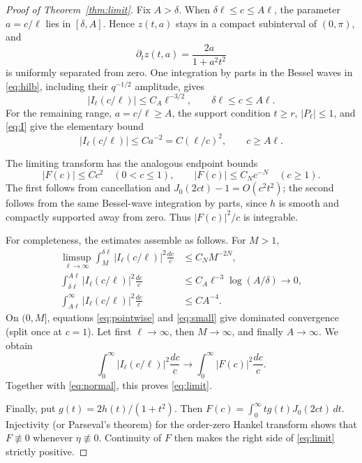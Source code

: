 \documentclass[11pt]{article}
\begin{document}
\begin{proof}[Proof of Theorem~\ref{thm:limit}]
Fix \(A>\delta\).  When \(\delta\ell\le c\le A\ell\), the parameter
\(a=c/\ell\) lies in \([\delta,A]\).  Hence \(z(t,a)\) stays in a compact
subinterval of \((0,\pi)\), and
\[
 \partial_t z(t,a)=\frac{2a}{1+a^2t^2}
\]
is uniformly separated from zero.  One integration by parts in the Bessel
waves in \eqref{eq:hilb}, including their \(q^{-1/2}\) amplitude, gives
\begin{equation}\label{eq:middle}
 |I_\ell(c/\ell)|\le C_A\ell^{-3/2},\qquad
 \delta\ell\le c\le A\ell.
\end{equation}
For the remaining range, \(a=c/\ell\ge A\), the support condition \(t\ge r\),
\(|P_\ell|\le1\), and \eqref{eq:I} give the elementary bound
\begin{equation}\label{eq:far}
 |I_\ell(c/\ell)|\le Ca^{-2}=C(\ell/c)^2,\qquad c\ge A\ell.
\end{equation}

The limiting transform has the analogous endpoint bounds
\begin{equation}\label{eq:Fbounds}
 |F(c)|\le Cc^2\quad(0<c\le1),\qquad
 |F(c)|\le C_Nc^{-N}\quad(c\ge1).
\end{equation}
The first follows from cancellation and \(J_0(2ct)-1=O(c^2t^2)\); the second
follows from the same Bessel-wave integration by parts, since \(h\) is smooth
and compactly supported away from zero.  Thus \(|F(c)|^2/c\) is integrable.

For completeness, the estimates assemble as follows.  For \(M>1\),
\begin{align*}
 \limsup_{\ell\to\infty}\int_M^{\delta\ell}
 |I_\ell(c/\ell)|^2\frac{dc}{c}&\le C_NM^{-2N},\\
 \int_{\delta\ell}^{A\ell}|I_\ell(c/\ell)|^2\frac{dc}{c}
 &\le C_A\ell^{-3}\log(A/\delta)\longrightarrow0,\\
 \int_{A\ell}^{\infty}|I_\ell(c/\ell)|^2\frac{dc}{c}&\le CA^{-4}.
\end{align*}
On \((0,M]\), equations \eqref{eq:pointwise} and \eqref{eq:small} give
dominated convergence (split once at \(c=1\)).  Let first \(\ell\to\infty\),
then \(M\to\infty\), and finally \(A\to\infty\).  We obtain
\[
 \int_0^\infty|I_\ell(c/\ell)|^2\frac{dc}{c}
 \longrightarrow \int_0^\infty|F(c)|^2\frac{dc}{c}.
\]
Together with \eqref{eq:normal}, this proves \eqref{eq:limit}.

Finally, put \(g(t)=2h(t)/(1+t^2)\).  Then
\(F(c)=\int_0^\infty tg(t)J_0(2ct)\,dt\).  Injectivity (or Parseval's theorem)
for the order-zero Hankel transform shows that \(F\not\equiv0\) whenever
\(\eta\not\equiv0\).  Continuity of \(F\) then makes the right side of
\eqref{eq:limit} strictly positive.
\end{proof}
\end{document}
